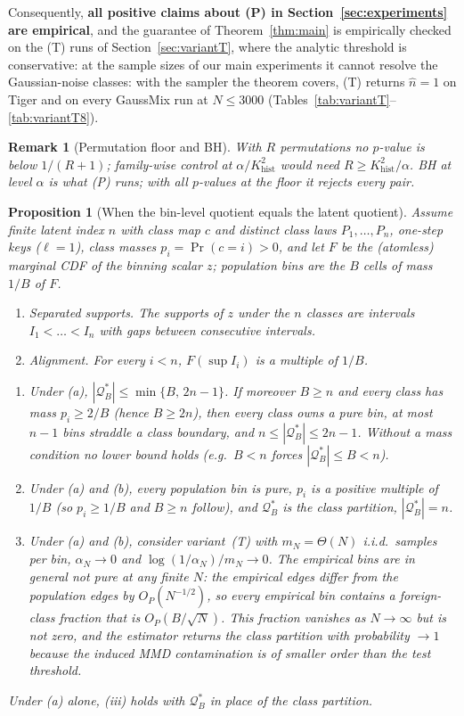 \documentclass[10pt]{article}
\newtheorem{proposition}{Proposition}
\newtheorem{remark}{Remark}
\newcommand{\Qstar}{\mathcal{Q}^*}
\newcommand{\Khist}{K_{\mathrm{hist}}}
\begin{document}
Consequently, \textbf{all positive claims about (P) in Section~\ref{sec:experiments}
are empirical}, and the guarantee of Theorem~\ref{thm:main} is empirically
checked on the (T) runs of Section~\ref{sec:variantT}, where the analytic
threshold is conservative: at the sample sizes of our main experiments it
cannot resolve the Gaussian-noise classes: with the sampler the theorem covers, (T) returns $\hat n=1$ on Tiger and on every GaussMix run at $N\le3000$ (Tables~\ref{tab:variantT}--\ref{tab:variantT8}).

\begin{remark}[Permutation floor and BH]
\label{rem:floor}
With $R$ permutations no $p$-value is below $1/(R{+}1)$; family-wise control at
$\alpha/\Khist^2$ would need $R\ge\Khist^2/\alpha$.  BH at level $\alpha$ is what
(P) runs; with all $p$-values at the floor it rejects every pair.
\end{remark}

\begin{proposition}[When the bin-level quotient equals the latent quotient]
\label{prop:binning}
Assume finite latent index $n$ with class map $c$ and distinct class laws
$P_1,\dots,P_n$, one-step keys ($\ell=1$), class masses $p_i=\Pr(c=i)>0$, and
let $F$ be the (atomless) marginal CDF of the binning scalar $z$; population
bins are the $B$ cells of mass $1/B$ of $F$.
\begin{enumerate}
\item[(a)] \emph{Separated supports.}  The supports of $z$ under the $n$
  classes are intervals $I_1<\dots<I_n$ with gaps between consecutive intervals.
\item[(b)] \emph{Alignment.}  For every $i<n$, $F(\sup I_i)$ is a multiple of $1/B$.
\end{enumerate}
\begin{enumerate}
\item[(i)] Under (a), $|\Qstar_B|\le\min\{B,\,2n-1\}$.  If moreover
  $B\ge n$ and every class has mass $p_i\ge2/B$ (hence $B\ge2n$), then every
  class owns a pure bin, at most $n-1$ bins straddle a class boundary, and
  $n\le|\Qstar_B|\le2n-1$.  Without a mass condition no lower bound holds
  (e.g.\ $B<n$ forces $|\Qstar_B|\le B<n$).
\item[(ii)] Under (a) and (b), every population bin is pure, $p_i$ is a
  positive multiple of $1/B$ (so $p_i\ge1/B$ and $B\ge n$ follow), and
  $\Qstar_B$ is the class partition, $|\Qstar_B|=n$.
\item[(iii)] Under (a) and (b), consider variant~(T) with $m_N=\Theta(N)$
  i.i.d.\ samples per bin, $\alpha_N\to0$ and $\log(1/\alpha_N)/m_N\to0$.
  The \emph{empirical} bins are in general \emph{not} pure at any finite $N$:
  the empirical edges differ from the population edges by $O_P(N^{-1/2})$, so
  every empirical bin contains a foreign-class fraction that is $O_P(B/\sqrt N)$.
  This fraction vanishes as $N\to\infty$ but is not zero, and the estimator
  returns the class partition with probability $\to1$ because the induced
  MMD contamination is of smaller order than the test threshold.
\end{enumerate}
Under (a) alone, (iii) holds with $\Qstar_B$ in place of the class partition.
\end{proposition}
\end{document}
